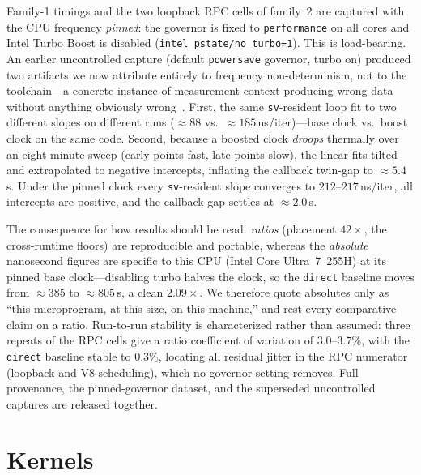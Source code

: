 \documentclass[conference]{IEEEtran}
\newcommand{\code}[1]{\texttt{#1}}
\begin{document}
Family-1 timings and the two loopback RPC cells of family~2 are captured with the
CPU frequency \emph{pinned}: the governor is fixed to \code{performance} on all
cores and Intel Turbo Boost is disabled (\code{intel\_pstate/no\_turbo=1}). This
is load-bearing. An earlier uncontrolled capture (default \code{powersave}
governor, turbo on) produced two artifacts we now attribute entirely to
frequency non-determinism, not to the toolchain---a concrete instance of
measurement context producing wrong data without anything obviously
wrong~\cite{mytkowicz}. First, the same \code{sv}-resident
loop fit to two different slopes on different runs ($\approx$$88$ vs.\
$\approx$$185$\,ns/iter)---base clock vs.\ boost clock on the same code. Second,
because a boosted clock \emph{droops} thermally over an eight-minute sweep (early
points fast, late points slow), the linear fits tilted and extrapolated to
negative intercepts, inflating the callback twin-gap to $\approx$$5.4$\,\textmu s.
Under the pinned clock every \code{sv}-resident slope converges to
$212$--$217$\,ns/iter, all intercepts are positive, and the callback gap settles
at $\approx$$2.0$\,\textmu s.

The consequence for how results should be read: \emph{ratios} (placement
$42\times$, the cross-runtime floors) are reproducible and portable, whereas the
\emph{absolute} nanosecond figures are specific to this CPU
(Intel Core Ultra~7~255H) at its pinned base clock---disabling turbo halves the
clock, so the \code{direct} baseline moves from $\approx$$385$ to
$\approx$$805$\,\textmu s, a clean $2.09\times$. We therefore quote absolutes only
as ``this microprogram, at this size, on this machine,'' and rest every
comparative claim on a ratio. Run-to-run stability is characterized rather than
assumed: three repeats of the RPC cells give a ratio coefficient of variation of
$3.0$--$3.7\%$, with the \code{direct} baseline stable to $0.3\%$, locating all
residual jitter in the RPC numerator (loopback and V8 scheduling), which no
governor setting removes. Full provenance, the pinned-governor dataset, and the
superseded uncontrolled captures are released together.

\section{Kernels}
\label{sec:kernels}
\end{document}
